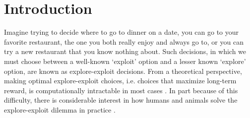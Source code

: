 \documentclass[12pt]{article}
\begin{document}
\begin{abstract}
		
	\end{abstract}
	\newpage
	\section*{Introduction}
	
	
	
	Imagine trying to decide where to go to dinner on a date, you can go to your favorite restaurant, the one you both really enjoy and always go to, or you can try a new restaurant that you know nothing about. Such decisions, in which we must choose between a well-known `exploit' option and a lesser known `explore' option, are known as explore-exploit decisions.  From a theoretical perspective, making optimal explore-exploit choices, i.e. choices that maximize long-term reward, is computationally intractable in most cases \citep{eegittins74, eeBasu18}. In part because of this difficulty, there is considerable interest in how humans and animals solve the explore-exploit dilemma in practice .
	
\end{document}
